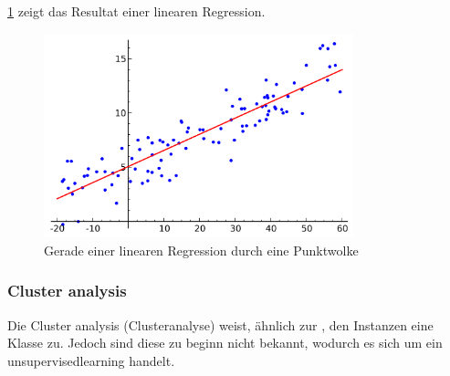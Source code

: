 \cref{fig:recherche:dataminingtechniken:disziplinen:regression} zeigt das Resultat einer linearen Regression.

\begin{figure}[H]
	\RawFloats
	\centering
	\includegraphics[width=0.8\textwidth]{images/Linear_regression.png}
	\caption{Gerade einer linearen Regression durch eine Punktwolke}
	\label{fig:recherche:dataminingtechniken:disziplinen:regression}
\end{figure}

\subsubsection{Cluster analysis}
\label{sec:recherche:dataminingtechniken:disziplinen:clusteranalysis}
Die Cluster analysis (Clusteranalyse) weist, ähnlich zur , den Instanzen eine Klasse zu. Jedoch sind diese zu beginn nicht bekannt, wodurch es sich um ein \gls{unsupervisedlearning} handelt.

